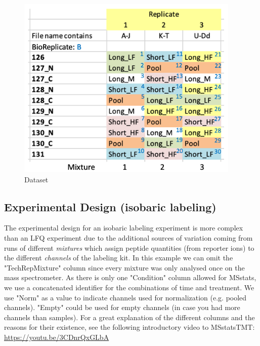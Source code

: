 \begin{figure}[htbp]
  \centering
  \includegraphics[width=0.95\textwidth]{graphics/isobaric/Dataset_MSstatsTMT.png}
  \caption{Dataset}
  \label{fig:isobaric_dataset_plubell}
\end{figure}

\subsection{Experimental Design (isobaric labeling)}
The experimental design for an isobaric labeling experiment is more complex than an LFQ experiment due to
the additional sources of variation coming from runs of different \textit{mixtures} which assign
peptide quantities (from reporter ions) to the different \textit{channels} of the labeling kit.
In this example we can omit the "TechRepMixture" column since every mixture was only analysed once on
the mass spectrometer. As there is only one "Condition" column allowed for MSstats, we use a concatenated
identifier for the combinations of time and treatment. We use "Norm" as a value to indicate channels
used for normalization (e.g. pooled channels). "Empty" could be used for empty channels (in case you had
more channels than samples).
For a great explanation of the different columns and the reasons for their existence,
see the following introductory video to MSstatsTMT:
\url{https://youtu.be/3CDnrQxGLbA}

